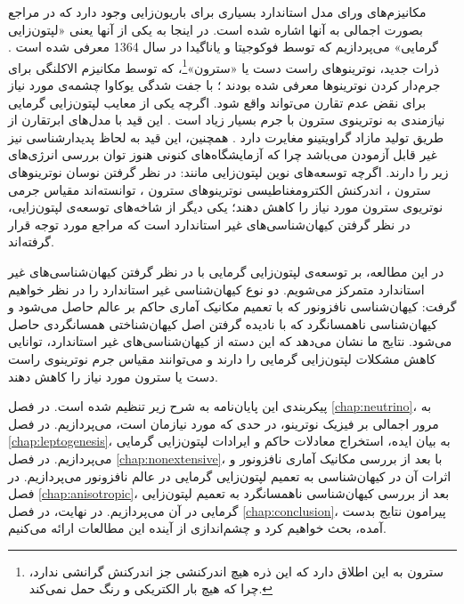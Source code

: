 \documentclass[a4paper]{book}
\begin{document}
مکانیزم‌های ورای مدل استاندارد بسیاری برای باریون‌زایی وجود دارد که در مراجع \cite{Elor:2022hpa,DiBari:2021fhs} بصورت اجمالی به آنها اشاره شده است. در اینجا به یکی از آنها یعنی «لپتون‌زایی گرمایی» می‌پردازیم که توسط فوکوجیتا و یاناگیدا در سال 1364 معرفی شده است \cite{Fukugita:1986hr}. ذرات جدید، نوترینوهای راست دست یا «سترون»\footnote{سترون به این اطلاق دارد که این ذره هیچ اندرکنشی جز اندرکنش گرانشی ندارد، چرا که هیچ بار الکتریکی و رنگ حمل نمی‌کند.}، که توسط مکانیزم الاکلنگی برای جرم‌دار کردن نوترینوها معرفی شده بودند \cite{Mohapatra:1980yp,Yanagida:1979as,Glashow:1979nm,Gell-Mann:1979vob,Minkowski:1977sc}؛ با جفت شدگی یوکاوا چشمه‌ی مورد نیاز برای نقض عدم تقارن  می‌تواند واقع شود.
اگرچه یکی از معایب لپتون‌زایی گرمایی نیازمندی به نوترینوی سترون با جرم بسیار زیاد است \cite{Davidson:2002qv}. این قید با مدل‌های ابرتقارن از طریق تولید مازاد گراویتینو مغایرت دارد \cite{Kawasaki:2008qe,Rychkov:2007uq,Kawasaki:1994af,Khlopov:1984pf,Weinberg:1982zq}. همچنین، این قید به لحاظ پدیدارشناسی نیز غیر قابل آزمودن می‌باشد چرا که آزمایشگاه‌های کنونی هنوز توان بررسی انرژی‌های زیر  را دارند. اگرچه توسعه‌های نوین لپتون‌زایی مانند: در نظر گرفتن نوسان نوترینوهای سترون \cite{Pilaftsis:2003gt,Akhmedov:1998qx,Asaka:2005pn}، اندرکنش الکترومغناطیسی نوترینوهای سترون \cite{Bell:2008fm}، توانسته‌اند مقیاس جرمی نوتریوی سترون مورد نیاز را کاهش دهند؛ یکی دیگر از شاخه‌های توسعه‌ی لپتون‌زایی، در نظر گرفتن کیهان‌شناسی‌های غیر استاندارد است که مراجع \cite{sym12020300,Dutta:2018zkg,PhysRevD.90.064050} مورد توجه قرار گرفته‌اند.

در این مطالعه، بر توسعه‌ی لپتون‌زایی گرمایی با در نظر گرفتن کیهان‌شناسی‌های غیر استاندارد متمرکز می‌شویم. دو نوع کیهان‌شناسی غیر استاندارد را در نظر خواهیم گرفت: کیهان‌شناسی نافزونور که با تعمیم مکانیک آماری حاکم بر عالم حاصل می‌شود و کیهان‌شناسی ناهمسانگرد که با نادیده گرفتن اصل کیهان‌شناختی همسانگردی حاصل می‌شود. نتایج ما نشان می‌دهد که این دسته از کیهان‌شناسی‌های غیر استاندارد، توانایی کاهش مشکلات لپتون‌زایی گرمایی را دارند و می‌توانند مقیاس جرم نوترینوی راست دست یا سترون مورد نیاز را کاهش دهند.

پیکربندی این پایان‌نامه به شرح زیر تنظیم شده است. در فصل \ref{chap:neutrino}، به مرور اجمالی بر فیزیک نوترینو، در حدی که مورد نیازمان است، می‌پردازیم. در فصل \ref{chap:leptogenesis}، به بیان ایده، استخراج معادلات حاکم و ایرادات لپتون‌زایی گرمایی می‌پردازیم. در فصل \ref{chap:nonextensive}، با بعد از بررسی مکانیک آماری نافزونور و اثرات آن در کیهان‌شناسی به تعمیم لپتون‌زایی گرمایی در عالم نافزونور می‌پردازیم. در فصل \ref{chap:anisotropic}، بعد از بررسی کیهان‌شناسی ناهمسانگرد به تعمیم لپتون‌زایی گرمایی در آن می‌پردازیم. در نهایت، در فصل \ref{chap:conclusion}، پیرامون نتایج بدست آمده، بحث خواهیم کرد و چشم‌اندازی از آینده این مطالعات ارائه می‌کنیم.
\end{document}
